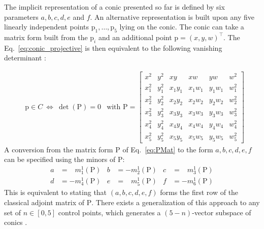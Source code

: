 \documentclass{birkjour}
\begin{document}
The implicit representation of a conic presented so far is defined by six parameters \(a,b,c,d,e\) and \(f\). An alternative representation is built upon any five linearly independent points \(\mathrm{p}_1, \dots, \mathrm{p}_5\) lying on the conic. The conic can take a matrix form built from the \(\mathrm{p}_i\) and an additional point \(\mathrm{p} = (x,y,w)^\top\).
The Eq.~\eqref{eq:conic_projective} is then equivalent to the following vanishing determinant \cite{hartley_multiple_2004}:

\begin{align} \label{eq:PMat}
& \mathrm{p}\in C ~ \Leftrightarrow ~  \det\left(\mathrm{P}\right) = 0 &\mbox{with }\mathrm{P} = \begin{bmatrix} 
x^2 & y^2 & xy & xw & yw & w^2 \\
x_1^2 & y_1^2 & x_1y_1 & x_1w_1 & y_1w_1 & w_1^2 \\
x_2^2 & y_2^2 & x_2y_2 & x_2w_2 & y_2w_2 & w_2^2 \\
x_3^2 & y_3^2 & x_3y_3 & x_3w_3 & y_3w_3 & w_3^2 \\
x_4^2 & y_4^2 & x_4y_4 & x_4w_4 & y_4w_4 & w_4^2 \\
x_5^2 & y_5^2 & x_5y_5 & x_5w_5 & y_5w_5 & w_5^2
\end{bmatrix}
\end{align}
A conversion from the matrix form \(\mathrm{P}\) of Eq.~\eqref{eq:PMat} to the form \(a,b,c,d,e,f\) can be specified using the minors of \(\mathrm{P}\):
\begin{equation} \label{eq:minors}
\begin{aligned}
a &= \;\;\: m_1^1(\mathrm{P})& b &= -m_2^1(\mathrm{P}) & c &= \;\;\: m_3^1(\mathrm{P})  \\
d &= -m_4^1(\mathrm{P})& e &= \;\;\: m_5^1(\mathrm{P})  & f &= -m_6^1(\mathrm{P})
\end{aligned}
\end{equation}
This is equivalent to stating that \((a,b,c,d,e,f)\) forms the first row of the classical adjoint matrix of \(\mathrm{P}\).
There exists a generalization of this approach to any set of \(n\in[0,5]\) control points, which generates a \((5-n)\)-vector subspace of conics \cite{fulton_algebraic_1989}. 

\end{document}
